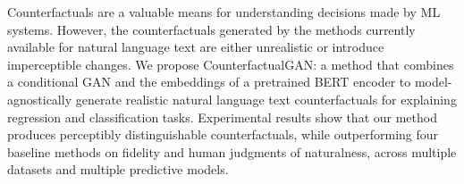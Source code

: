 Counterfactuals are a valuable means for understanding decisions made by ML systems. However, the counterfactuals generated by the methods currently available for natural language text are either unrealistic or introduce imperceptible changes. We propose CounterfactualGAN: a method that combines a conditional GAN and the embeddings of a pretrained BERT encoder to model-agnostically generate realistic natural language text counterfactuals for explaining regression and classification tasks. Experimental results show that our method produces perceptibly distinguishable counterfactuals, while outperforming four baseline methods on fidelity and human judgments of naturalness, across multiple datasets and multiple predictive models.
